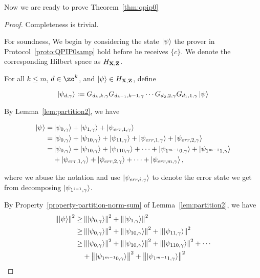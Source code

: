 Now we are ready to prove Theorem~\ref{thm:qpip0}
\begin{proof}
Completeness is trivial.


For soundness, We begin by considering the state $\ket{\psi}$ the prover in Protocol~\ref{proto:QPIP0samp} hold before he receives $\{c\}$. We denote the corresponding Hilbert space as $H_{\mathbf{X},\mathbf{Z}}$.


For all $k\leq m$, $d\in \zo^k$, and $\ket{\psi} \in H_{\mathbf{X},\mathbf{Z}}$, define

$$\ket{\psi_{d,\gamma}}:= G_{d_k,k,\gamma}G_{d_{k-1},k-1,\gamma}\cdots G_{d_2,2,\gamma} G_{d_1,1,\gamma} \ket{\psi}$$

By Lemma~\ref{lem:partition2}, we have  

\begin{align} \label{eq:partition-string}
    \ket{\psi} =& \ket{\psi_{0,\gamma}}+\ket{\psi_{1,\gamma}}+\ket{\psi_{err,1,\gamma}} \nonumber \\
    =& \ket{\psi_{0,\gamma}}+\ket{\psi_{10,\gamma}}+\ket{\psi_{11,\gamma}}+\ket{\psi_{err,1,\gamma}}+\ket{\psi_{err,2,\gamma}} \nonumber \\
    =& \ket{\psi_{0,\gamma}}+\ket{\psi_{10,\gamma}}+\ket{\psi_{110,\gamma}}+\cdots+\ket{\psi_{1^{m-1}0,\gamma}}+\ket{\psi_{1^{m-1}1,\gamma}} \nonumber \\
    &+\ket{\psi_{err,1,\gamma}}+\ket{\psi_{err,2,\gamma}}+\cdots+\ket{\psi_{err,m,\gamma}}, 
\end{align}

where we abuse the notation and use $\ket{\psi_{err,i,\gamma}}$ to denote the error state we get from decomposing $\ket{\psi_{1^{i-1},\gamma}}$. %

By Property~\ref{property-partition-norm-sum} of Lemma~\ref{lem:partition2}, we have
\begin{align} \label{eq:bad-term-sum}
    \left\lVert\ket{\psi}\right\rVert^2 \geq& \left\lVert\ket{\psi_{0,\gamma}}\right\rVert^2+\left\lVert\ket{\psi_{1,\gamma}}\right\rVert^2 \nonumber \\
    \geq& \left\lVert\ket{\psi_{0,\gamma}}\right\rVert^2+
    \left\lVert\ket{\psi_{10,\gamma}}\right\rVert^2+ \left\lVert\ket{\psi_{11,\gamma}}\right\rVert^2 \nonumber \\
    \geq& \left\lVert\ket{\psi_{0,\gamma}}\right\rVert^2+
    \left\lVert\ket{\psi_{10,\gamma}}\right\rVert^2+ \left\lVert\ket{\psi_{110,\gamma}}\right\rVert^2 +\cdots  \nonumber \\
    &+ \left\lVert\ket{\psi_{1^{m-1}0,\gamma}}\right\rVert^2+ \left\lVert\ket{\psi_{1^{m-1}1,\gamma}}\right\rVert^2
\end{align}


\end{proof}
